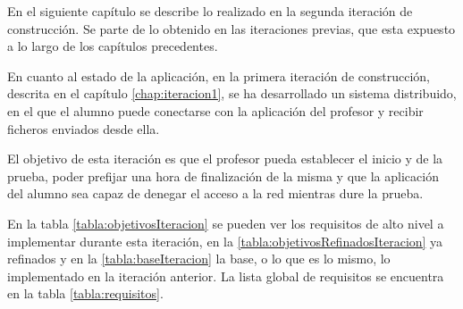 
\label{chap:iteracion2}


En el siguiente capítulo se describe lo realizado en la segunda iteración de construcción.
Se parte de lo obtenido en las iteraciones previas, que esta expuesto a lo largo de los capítulos precedentes.
\newline

En cuanto al estado de la aplicación, en la primera iteración de construcción, descrita en el capítulo \ref{chap:iteracion1}, se ha desarrollado un sistema distribuido, en el que el alumno puede conectarse con la aplicación del profesor y recibir ficheros enviados desde ella.
\newline

El objetivo de esta iteración es que el profesor pueda establecer el inicio y de la prueba, poder prefijar una hora de finalización de la misma y que la aplicación del alumno sea capaz de denegar el acceso a la red mientras dure la prueba.
\newline

En la tabla \ref{tabla:objetivosIteracion} se pueden ver los requisitos de alto nivel a implementar durante esta iteración, en la \ref{tabla:objetivosRefinadosIteracion} ya refinados y en la \ref{tabla:baseIteracion} la base, o lo que es lo mismo, lo implementado en la iteración anterior. La lista global de requisitos se encuentra en la tabla \ref{tabla:requisitos}.
\newline

\chaptertoc


